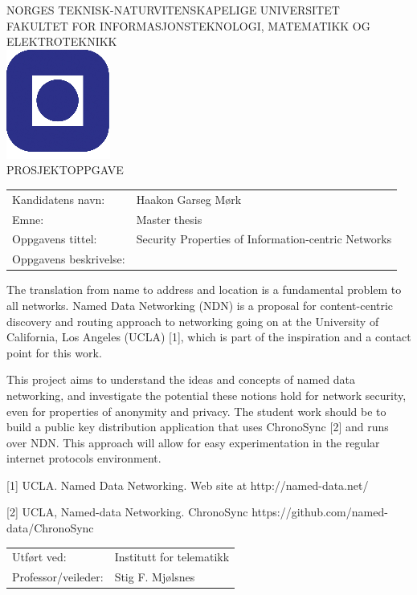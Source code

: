 \documentclass[a4paper,11pt]{article}
\begin{document}
\sffamily
\begin{titlepage}
\begin{center}
\textsc{NORGES TEKNISK-NATURVITENSKAPELIGE UNIVERSITET\\
FAKULTET FOR INFORMASJONSTEKNOLOGI, MATEMATIKK OG ELEKTROTEKNIKK} \\
\vspace{0.5cm} 
\includegraphics[scale=0.5]{NTNU-logo} \\
\vspace{1.0cm}
{\Huge{PROSJEKTOPPGAVE}}
\vspace{1.0cm}
\end{center}

\begin{tabular}{@{}p{5cm}l}
Kandidatens navn:	& Haakon Garseg Mørk\\
Emne:			& Master thesis\\
Oppgavens tittel: 	& Security Properties of Information-centric Networks \\
Oppgavens beskrivelse: 	& \\
\end{tabular}

The translation from name to address and location is a fundamental problem to all networks.
Named Data Networking (NDN) is a proposal for content-centric discovery and routing approach to networking
going on at the University of California, Los Angeles (UCLA) [1], which is part of the inspiration and a contact point for this work.

This project aims to understand the ideas and concepts of named data networking, and investigate the
potential these notions hold for network security, even for properties of anonymity and privacy. 
The student work should be to build a public key distribution application that uses ChronoSync [2] and runs over NDN.
This approach will allow for easy experimentation in the regular internet protocols environment.     

[1]  UCLA.  Named Data Networking. Web site at http://named-data.net/

[2]  UCLA, Named-data Networking. ChronoSync https://github.com/named-data/ChronoSync

\begin{tabular}{@{}p{5cm}l}
Utf\o{}rt ved:	& Institutt for telematikk \\
Professor/veileder:	& Stig F. Mjølsnes \\
\end{tabular}

\end{titlepage}
\end{document}
